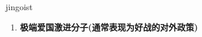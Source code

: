 
\begin{frame}
{\huge jingoist}
\begin{center}
\begin{enumerate}\Large
  \item \textbf{极端爱国激进分子(通常表现为好战的对外政策)}
\end{enumerate}
\end{center}
\end{frame}
